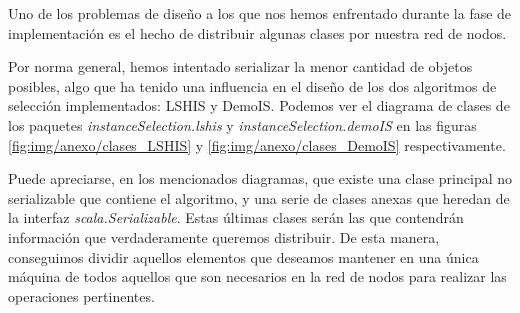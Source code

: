 Uno de los problemas de diseño a los que nos hemos enfrentado durante la fase de implementación es el hecho de distribuir algunas clases por nuestra red de nodos.

Por norma general, hemos intentado serializar la menor cantidad de objetos posibles, algo que ha tenido una influencia en el diseño de los dos algoritmos de selección implementados: LSHIS y DemoIS. Podemos ver el diagrama de clases de los paquetes \textit{instanceSelection.lshis} y \textit{instanceSelection.demoIS} en las figuras \ref{fig:img/anexo/clases_LSHIS} y \ref{fig:img/anexo/clases_DemoIS} respectivamente.

Puede apreciarse, en los mencionados diagramas, que existe una clase principal no serializable que contiene el algoritmo, y una serie de clases anexas que heredan de la interfaz \textit{scala.Serializable}. Estas últimas clases serán las que contendrán información que verdaderamente queremos distribuir. De esta manera, conseguimos dividir aquellos elementos que deseamos mantener en una única máquina de todos aquellos que son necesarios en la red de nodos para realizar las operaciones pertinentes.



